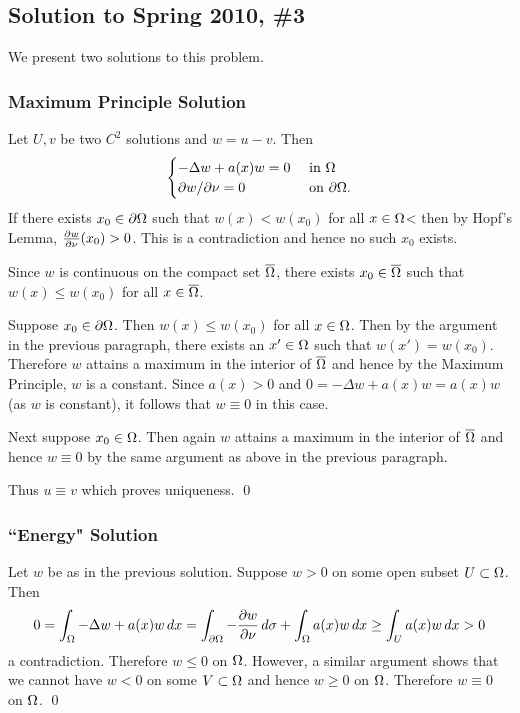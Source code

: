 \subsection*{Solution to Spring 2010, \#3}\label{s103}
We present two solutions to this problem.

\subsubsection*{Maximum Principle Solution}
Let $U, v $ be two $C^{2}$ solutions and $w = u - v$. Then
\begin{align*}
\begin{cases}
-\Delta w + a(x)w = 0 & \text{ in } \Omega\\
\partial w/\partial \nu = 0 & \text{ on } \partial\Omega.
\end{cases}
\end{align*}
If there exists $x_{0} \in \partial \Omega$ such that
$w(x) < w(x_{0})$ for all $x \in \Omega$< then by Hopf's Lemma,
$\frac{\partial w}{\partial \nu}(x_{0}) > 0$. This is a contradiction
and hence no such $x_{0}$ exists.

Since $w$ is continuous on the compact set $\overline{\Omega}$,
there exists $x_{0} \in \overline{\Omega}$ such that
$w(x) \leq w(x_{0})$ for all $x \in \overline{\Omega}$.

Suppose
$x_{0} \in \partial\Omega$. Then $w(x) \leq w(x_{0})$ for all $x \in \Omega$.
Then by the argument in the previous paragraph, there exists
an $x' \in \Omega$ such that $w(x') = w(x_{0})$. Therefore
$w$ attains a maximum in the interior of $\overline{\Omega}$ and hence
by the Maximum Principle, $w$ is a constant. Since
$a(x) > 0$ and $0 = -\Delta w + a(x)w = a(x) w$ (as $w$ is constant),
it follows that $w \equiv 0$ in this case.

Next suppose $x_{0} \in \Omega$. Then again $w$ attains a maximum
in the interior of $\overline{\Omega}$ and hence $w \equiv 0$ by the same
argument as above in the previous paragraph.

Thus $u \equiv v$ which proves uniqueness.
\hfill\qed

\subsubsection*{``Energy" Solution}
Let $w$ be as in the previous solution.
Suppose $w > 0$ on some open subset $U \subset \Omega$. Then
\begin{align*}
0 = \int_{\Omega}-\Delta w + a(x)w\, dx = \int_{\partial \Omega}-\frac{\partial w}{\partial \nu}\, d\sigma + \int_{\Omega}a(x)w\, dx \geq \int_{U}a(x)w\, dx > 0
\end{align*}
a contradiction. Therefore $w \leq 0$ on $\Omega$. However, a similar argument
shows that we cannot have $w < 0$ on some $V \subset \Omega$ and hence $w \geq 0$ on $\Omega$. Therefore
$w \equiv 0$ on $\Omega$.
\hfill\qed

